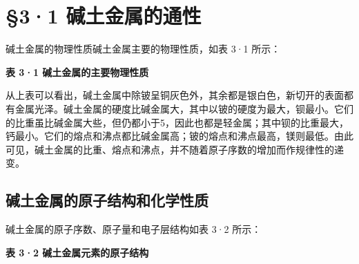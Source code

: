 \section{§3·1 碱土金属的通性}

碱土金属的物理性质碱土金属主要的物理性质，如表 3·1 所示：

\textbf{表 3·1 碱土金属的主要物理性质}

{\centering
\small\setlength{\tabcolsep}{3pt}%
\par
}

从上表可以看出，碱土金属中除铍呈铜灰色外，其余都是银白色，新切开的表面都有金属光泽。碱土金属的硬度比碱金属大，其中以铍的硬度为最大，钡最小。它们的比重虽比碱金属大些，但仍都小于5，因此也都是轻金属；其中钡的比重最大，钙最小。它们的熔点和沸点都比碱金属高；铍的熔点和沸点最高，镁则最低。由此可见，碱土金属的比重、熔点和沸点，并不随着原子序数的增加而作规律性的递变。

\subsection{碱土金属的原子结构和化学性质}

碱土金属的原子序数、原子量和电子层结构如表 3·2 所示：

\textbf{表 3·2 碱土金属元素的原子结构}

